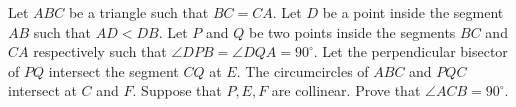 Let $ABC$ be a triangle such that $BC = CA$.
Let $D$ be a point inside the segment $AB$ such that $AD<DB$.
Let $P$ and $Q$ be two points inside the segments $BC$ and $CA$ respectively
such that $\angle DPB = \angle DQA = 90^\circ$.
Let the perpendicular bisector of $PQ$ intersect the segment $CQ$ at $E$.
The circumcircles of $ABC$ and $PQC$ intersect at $C$ and $F$.
Suppose that $P, E, F$ are collinear.
Prove that $\angle ACB=90^\circ$.
